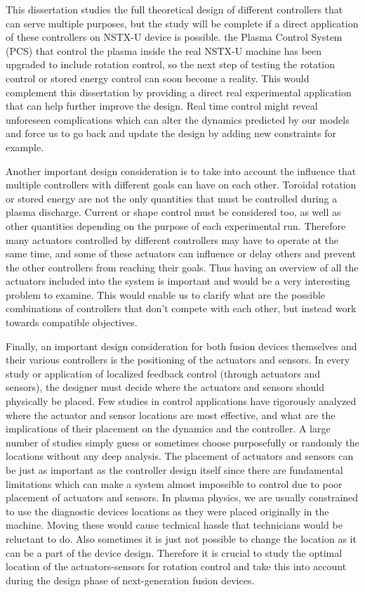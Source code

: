 \documentclass[12pt,lot, lof]{puthesis}
\begin{document}
This dissertation studies the full theoretical design of different controllers that can serve multiple purposes, but the study will be complete if a direct application of these controllers on NSTX-U device is possible.
the Plasma Control System (PCS) that control the plasma inside the real NSTX-U machine has been upgraded to include rotation control, so the next step of testing the rotation control or stored energy control can soon become a reality.
This would complement this dissertation by providing a direct real experimental application that can help further improve the design.
Real time control might reveal unforeseen complications which can alter the dynamics predicted by our models and force us to go back and update the design by adding new constraints for example.

Another important design consideration is to take into account the influence that multiple controllers with different goals can have on each other.
Toroidal rotation or stored energy are not the only quantities that must be controlled during a plasma discharge.
Current or shape control must be considered too, as well as other quantities depending on the purpose of each experimental run.
Therefore many actuators controlled by different controllers may have to operate at the same time, and some of these actuators can influence or delay others and prevent the other controllers from reaching their goals.
Thus having an overview of all the actuators included into the system is important and would be a very interesting problem to examine.
This would enable us to clarify what are the possible combinations of controllers that don't compete with each other, but instead work towards compatible objectives.

Finally, an important design consideration for both fusion devices themselves and their various controllers is the positioning of the actuators and sensors.
In every study or application of localized feedback control (through actuators and sensors), the designer must decide where the actuators and sensors should physically be placed.
Few studies in control applications have rigorously analyzed where the actuator and sensor locations are most effective, and what are the implications of their placement on the dynamics and the controller. A large number of studies simply guess or sometimes choose purposefully or randomly the locations without any deep analysis.
The placement of actuators and sensors can be just as important as the controller design itself since there are fundamental limitations which can make a system almost impossible to control due to poor placement of actuators and sensors.
In plasma physics, we are usually constrained to use the diagnostic devices locations as they were placed originally in the machine. Moving these would cause technical hassle that technicians would be reluctant to do. Also sometimes it is just not possible to change the location as it can be a part of the device design.
Therefore it is crucial to study the optimal location of the actuators-sensors for rotation control and take this into account during the design phase of next-generation fusion devices.
\end{document}
